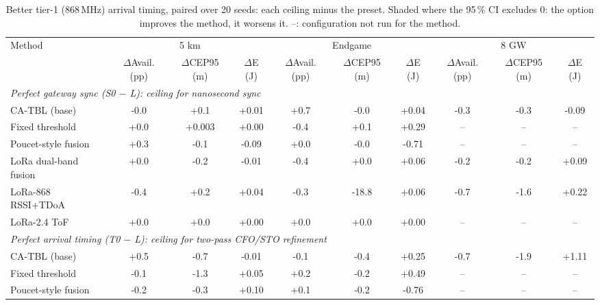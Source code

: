 
\begin{table}[t]
\centering
\footnotesize
\setlength{\tabcolsep}{2.5pt}
\caption{Better tier-1 (868\,MHz) arrival timing, paired over 20 seeds: each ceiling minus the preset. Shaded where the 95\,\% CI excludes 0: \colorbox{fav}{the option improves the method}, \colorbox{unf}{it worsens it}. --: configuration not run for the method.}
\label{tab:nohw-timing}
\begin{tabular}{lccccccccc}
\toprule
Method & \multicolumn{3}{c}{5 km} & \multicolumn{3}{c}{Endgame} & \multicolumn{3}{c}{8 GW} \\
\cmidrule(lr){2-4}\cmidrule(lr){5-7}\cmidrule(lr){8-10}
 & $\Delta$Avail. (pp) & $\Delta$CEP95 (m) & $\Delta$E (J) & $\Delta$Avail. (pp) & $\Delta$CEP95 (m) & $\Delta$E (J) & $\Delta$Avail. (pp) & $\Delta$CEP95 (m) & $\Delta$E (J) \\
\midrule
\multicolumn{10}{l}{\emph{Perfect gateway sync (S0 $-$ L): ceiling for nanosecond sync}} \\
CA-TBL (base) & -0.0 & +0.1 & +0.01 & \cellcolor{fav}+0.7 & -0.0 & +0.04 & -0.3 & -0.3 & -0.09 \\
Fixed threshold & +0.0 & \cellcolor{unf}+0.003 & +0.00 & -0.4 & +0.1 & +0.29 & -- & -- & -- \\
Poucet-style fusion & +0.3 & -0.1 & -0.09 & +0.0 & -0.0 & -0.71 & -- & -- & -- \\
LoRa dual-band fusion & +0.0 & -0.2 & -0.01 & -0.4 & +0.0 & +0.06 & -0.2 & -0.2 & +0.09 \\
LoRa-868 RSSI+TDoA & -0.4 & +0.2 & +0.04 & -0.3 & \cellcolor{fav}-18.8 & +0.06 & -0.7 & -1.6 & +0.22 \\
LoRa-2.4 ToF & +0.0 & +0.0 & +0.00 & +0.0 & +0.0 & +0.00 & -- & -- & -- \\
\midrule
\multicolumn{10}{l}{\emph{Perfect arrival timing (T0 $-$ L): ceiling for two-pass CFO/STO refinement}} \\
CA-TBL (base) & \cellcolor{fav}+0.5 & -0.7 & -0.01 & -0.1 & \cellcolor{fav}-0.4 & +0.25 & -0.7 & \cellcolor{fav}-1.9 & \cellcolor{unf}+1.11 \\
Fixed threshold & -0.1 & -1.3 & +0.05 & +0.2 & -0.2 & +0.49 & -- & -- & -- \\
Poucet-style fusion & -0.2 & -0.3 & +0.10 & +0.1 & \cellcolor{fav}-0.2 & -0.76 & -- & -- & -- \\

\end{tabular}
\end{table}
